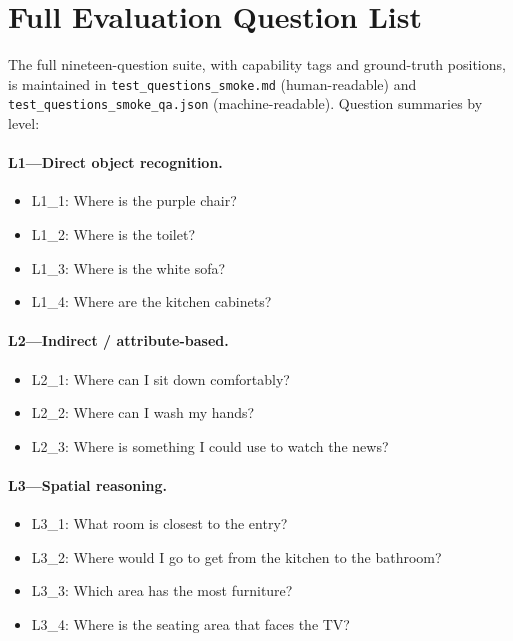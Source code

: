 \documentclass[12pt,letterpaper,oneside]{article}
\begin{document}
\appendix

\section{Full Evaluation Question List}\label{app:questions}

The full nineteen-question suite, with capability tags and
ground-truth positions, is maintained in
\texttt{test\_questions\_smoke.md} (human-readable) and
\texttt{test\_questions\_smoke\_qa.json} (machine-readable).  Question
summaries by level:

\paragraph{L1---Direct object recognition.}
\begin{itemize}\setlength\itemsep{0pt}
  \item L1\_1: Where is the purple chair?
  \item L1\_2: Where is the toilet?
  \item L1\_3: Where is the white sofa?
  \item L1\_4: Where are the kitchen cabinets?
\end{itemize}

\paragraph{L2---Indirect / attribute-based.}
\begin{itemize}\setlength\itemsep{0pt}
  \item L2\_1: Where can I sit down comfortably?
  \item L2\_2: Where can I wash my hands?
  \item L2\_3: Where is something I could use to watch the news?
\end{itemize}

\paragraph{L3---Spatial reasoning.}
\begin{itemize}\setlength\itemsep{0pt}
  \item L3\_1: What room is closest to the entry?
  \item L3\_2: Where would I go to get from the kitchen to the
    bathroom?
  \item L3\_3: Which area has the most furniture?
  \item L3\_4: Where is the seating area that faces the TV?
\end{itemize}
\end{document}
